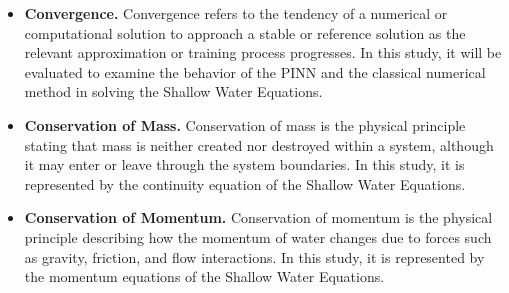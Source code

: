 \begin{itemize}
    \item \textbf{Convergence.}
    Convergence refers to the tendency of a numerical or computational solution to approach a stable or reference solution as the relevant approximation or training process progresses. In this study, it will be evaluated to examine the behavior of the PINN and the classical numerical method in solving the Shallow Water Equations.

    \item \textbf{Conservation of Mass.}
    Conservation of mass is the physical principle stating that mass is neither created nor destroyed within a system, although it may enter or leave through the system boundaries. In this study, it is represented by the continuity equation of the Shallow Water Equations.

    \item \textbf{Conservation of Momentum.}
    Conservation of momentum is the physical principle describing how the momentum of water changes due to forces such as gravity, friction, and flow interactions. In this study, it is represented by the momentum equations of the Shallow Water Equations.

\end{itemize}